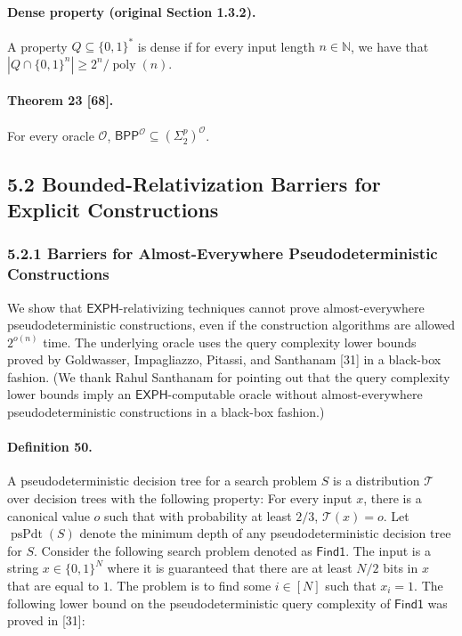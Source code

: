 \documentclass[10pt,a4paper]{article}
\begin{document}
\paragraph{Dense property (original Section 1.3.2).} A property $Q\subseteq\{0,1\}^*$ is dense if for every input length $n\in\mathbb N$, we have that $|Q\cap\{0,1\}^n|\geq2^n/\operatorname{poly}(n)$.
\paragraph{Theorem 23 [68].} For every oracle $\mathcal O$, $\mathsf{BPP}^{\mathcal O}\subseteq(\Sigma^p_2)^{\mathcal O}$.

\subsection*{5.2 Bounded-Relativization Barriers for Explicit Constructions}
\subsubsection*{5.2.1 Barriers for Almost-Everywhere Pseudodeterministic Constructions}
We show that $\mathsf{EXPH}$-relativizing techniques cannot prove almost-everywhere pseudodeterministic constructions, even if the construction algorithms are allowed $2^{o(n)}$ time. The underlying oracle uses the query complexity lower bounds proved by Goldwasser, Impagliazzo, Pitassi, and Santhanam [31] in a black-box fashion. (We thank Rahul Santhanam for pointing out that the query complexity lower bounds imply an $\mathsf{EXPH}$-computable oracle without almost-everywhere pseudodeterministic constructions in a black-box fashion.)
\paragraph{Definition 50.} A pseudodeterministic decision tree for a search problem $S$ is a distribution $\mathcal T$ over decision trees with the following property: For every input $x$, there is a canonical value $o$ such that with probability at least $2/3$, $\mathcal T(x)=o$. Let $\operatorname{psPdt}(S)$ denote the minimum depth of any pseudodeterministic decision tree for $S$.
Consider the following search problem denoted as $\mathsf{Find1}$. The input is a string $x\in\{0,1\}^N$ where it is guaranteed that there are at least $N/2$ bits in $x$ that are equal to $1$. The problem is to find some $i\in[N]$ such that $x_i=1$. The following lower bound on the pseudodeterministic query complexity of $\mathsf{Find1}$ was proved in [31]:
\end{document}
